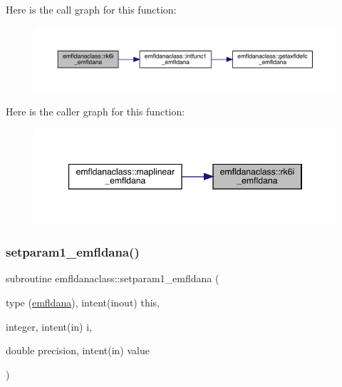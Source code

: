 Here is the call graph for this function\+:\nopagebreak
\begin{figure}[H]
\begin{center}
\leavevmode
\includegraphics[width=350pt]{namespaceemfldanaclass_aed1f8dea5d7871c10eb2835b204dd581_cgraph}
\end{center}
\end{figure}
Here is the caller graph for this function\+:\nopagebreak
\begin{figure}[H]
\begin{center}
\leavevmode
\includegraphics[width=347pt]{namespaceemfldanaclass_aed1f8dea5d7871c10eb2835b204dd581_icgraph}
\end{center}
\end{figure}
\mbox{\label{namespaceemfldanaclass_acef322ec41908ed27c9dc0f7fe9f4c1c}} 
\subsubsection{\texorpdfstring{setparam1\_emfldana()}{setparam1\_emfldana()}}
{\footnotesize\ttfamily subroutine emfldanaclass\+::setparam1\+\_\+emfldana (\begin{DoxyParamCaption}\item[{type (\mbox{\hyperlink{namespaceemfldanaclass_structemfldanaclass_1_1emfldana}{emfldana}}), intent(inout)}]{this,  }\item[{integer, intent(in)}]{i,  }\item[{double precision, intent(in)}]{value }\end{DoxyParamCaption})}

\mbox{\label{namespaceemfldanaclass_aac0a3936b2e95e4a86fee5277907646e}} 
